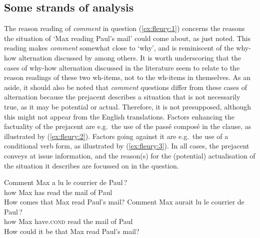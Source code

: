 \documentclass[output=paper,colorlinks,citecolor=brown,
]{langscibook}
\begin{document}
\subsection{Some strands of analysis}\label{strands}

The reason reading of  \textit{comment}  in question (\ref{ex:fleury:1}) concerns the reasons the situation of `Max reading Paul's mail' could come about, as just noted. This reading makes \textit{comment}  somewhat close to `why', and is reminiscent of the why-how alternation discussed by \citep{Collins91,Ochi04,Tsai08}
among others. 
It is worth underscoring that the cases of why-how alternation discussed in the literature  seem to relate to the reason readings of these two wh-items, not to the wh-items in themselves. 
%
As an aside, it should also be noted that \textit{comment} questions differ from these cases of alternation because the prejacent describes a situation that is not necessarily true, as it may be potential or actual. Therefore, it is not presupposed,
although this might not appear from the English translations. Factors  enhancing the factuality of the prejacent are e.g.\  the use of  the pass\'e compos\'e in the clause, as illustrated by (\ref{ex:fleury:2}).
Factors going against it are e.g.\ the use of a conditional verb form, as illustrated by (\ref{ex:fleury:3}). In all cases, the prejacent conveys at issue information, and the reason(s) for the (potential) actualisation of the situation it describes are focussed on in the question. 

\begin{exe}
\ex\label{ex:fleury:2} 
\gll Comment Max a lu le courrier de Paul\,? \\
how Max has read the mail of Paul \\
\glt How comes that Max read Paul's mail?
\ex\label{ex:fleury:3} 
\gll Comment Max aurait lu le courrier de Paul\,? \\
how Max have.\textsc{cond} read the mail of Paul \\
\glt How could it be that Max read Paul's mail?
\end{exe}
\end{document}
